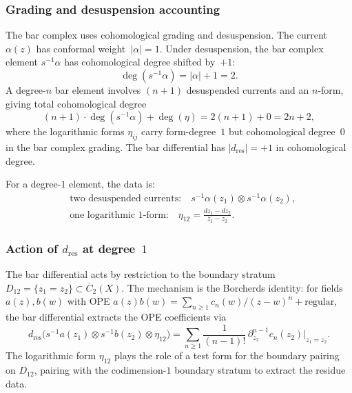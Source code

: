 \subsubsection*{Grading and desuspension accounting}

The bar complex uses cohomological grading and desuspension.
The current $\alpha(z)$ has conformal weight~$|\alpha| = 1$.
Under desuspension, the bar complex element $s^{-1}\alpha$ has
cohomological degree shifted by~$+1$:
\begin{equation}\label{eq:frame-desuspension-shift}
\deg(s^{-1}\alpha) = |\alpha| + 1 = 2.
\end{equation}
A degree-$n$ bar element involves $(n+1)$ desuspended currents
and an $n$-form, giving total cohomological degree
\[
(n+1) \cdot \deg(s^{-1}\alpha) + \deg(\eta) = 2(n+1) + 0 = 2n + 2,
\]
where the logarithmic forms $\eta_{ij}$ carry form-degree~$1$ but
cohomological degree~$0$ in the bar complex grading.  The bar
differential has $|d_{\mathrm{res}}| = +1$ in cohomological degree.

For a degree-$1$ element, the data is:
\begin{align}
&\text{two desuspended currents:} \quad
  s^{-1}\alpha(z_1) \otimes s^{-1}\alpha(z_2),
  \label{eq:frame-deg1-currents} \\
&\text{one logarithmic $1$-form:} \quad
  \eta_{12} = \frac{dz_1 - dz_2}{z_1 - z_2}.
  \label{eq:frame-deg1-form}
\end{align}

\subsubsection*{Action of $d_{\mathrm{res}}$ at degree~$1$}

The bar differential acts by restriction to the boundary stratum
$D_{12} = \{z_1 = z_2\} \subset \overline{C}_2(X)$.  The mechanism
is the Borcherds identity: for fields $a(z), b(w)$ with OPE
$a(z)b(w) = \sum_{n \geq 1} c_n(w)/(z-w)^n + \mathrm{regular}$,
the bar differential extracts the OPE coefficients via
\begin{equation}\label{eq:frame-borcherds-extraction}
d_{\mathrm{res}}\bigl(
  s^{-1}a(z_1) \otimes s^{-1}b(z_2) \otimes \eta_{12}
\bigr)
= \sum_{n \geq 1} \frac{1}{(n-1)!}\,
  \partial_{z_2}^{n-1} c_n(z_2)\Big|_{z_1 = z_2}.
\end{equation}
The logarithmic form $\eta_{12}$ plays the role of a test
form for the boundary pairing on $D_{12}$, pairing with the
codimension-$1$ boundary stratum to extract the
residue data.

